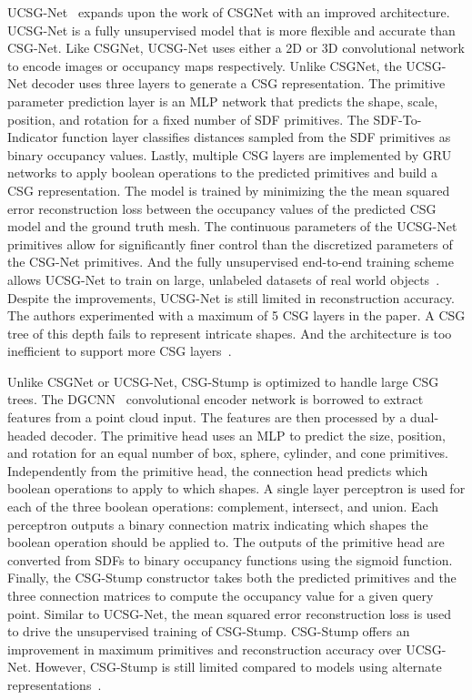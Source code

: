 UCSG-Net~\cite{Kania2020} expands upon the work of CSGNet with an improved architecture. UCSG-Net is a fully unsupervised model that is more flexible and accurate than CSG-Net. Like CSGNet, UCSG-Net uses either a 2D or 3D convolutional network to encode images or occupancy maps respectively. Unlike CSGNet, the UCSG-Net decoder uses three layers to generate a CSG representation. The primitive parameter prediction layer is an MLP network that predicts the shape, scale, position, and rotation for a fixed number of SDF primitives. The SDF-To-Indicator function layer classifies distances sampled from the SDF primitives as binary occupancy values. Lastly, multiple CSG layers are implemented by GRU networks to apply boolean operations to the predicted primitives and build a CSG representation. The model is trained by minimizing the the mean squared error reconstruction loss between the occupancy values of the predicted CSG model and the ground truth mesh. The continuous parameters of the UCSG-Net primitives allow for significantly finer control than the discretized parameters of the CSG-Net primitives. And the fully unsupervised end-to-end training scheme allows UCSG-Net to train on large, unlabeled datasets of real world objects~\cite{Kania2020}. Despite the improvements, UCSG-Net is still limited in reconstruction accuracy. The authors experimented with a maximum of 5 CSG layers in the paper. A CSG tree of this depth fails to represent intricate shapes. And the architecture is too inefficient to support more CSG layers~\cite{Ren2021}.

Unlike CSGNet or UCSG-Net, CSG-Stump is optimized to handle large CSG trees. The DGCNN~\cite{Phan2018} convolutional encoder network is borrowed to extract features from a point cloud input. The features are then processed by a dual-headed decoder. The primitive head uses an MLP to predict the size, position, and rotation for an equal number of box, sphere, cylinder, and cone primitives. Independently from the primitive head, the connection head predicts which boolean operations to apply to which shapes. A single layer perceptron is used for each of the three boolean operations: complement, intersect, and union. Each perceptron outputs a binary connection matrix indicating which shapes the boolean operation should be applied to. The outputs of the primitive head are converted from SDFs to binary occupancy functions using the sigmoid function. Finally, the CSG-Stump constructor takes both the predicted primitives and the three connection matrices to compute the occupancy value for a given query point. Similar to UCSG-Net, the mean squared error reconstruction loss is used to drive the unsupervised training of CSG-Stump. CSG-Stump offers an improvement in maximum primitives and reconstruction accuracy over UCSG-Net. However, CSG-Stump is still limited compared to models using alternate representations~\cite{Phan2018}.

